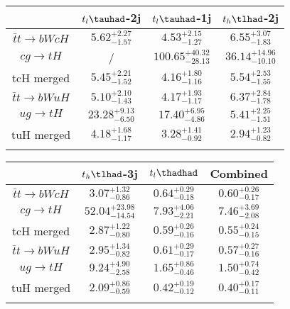 \centering
\begin{tabular}{|cccc} \toprule\toprule
 & $t_l\tauhad$-2j & $t_l\tauhad$-1j & $t_h\tlhad$-2j\\\midrule
$\bar{t}t\to bWcH$ & $5.62^{+2.27}_{-1.57}$ & $4.53^{+2.15}_{-1.27}$ & $6.55^{+3.07}_{-1.83}$\\
$cg\to tH$ &  / & $100.65^{+40.32}_{-28.13}$ & $36.14^{+14.96}_{-10.10}$\\
tcH merged & $5.45^{+2.21}_{-1.52}$ & $4.16^{+1.80}_{-1.16}$ & $5.54^{+2.53}_{-1.55}$\\
$\bar{t}t\to bWuH$ & $5.10^{+2.10}_{-1.43}$ & $4.17^{+1.93}_{-1.17}$ & $6.37^{+2.84}_{-1.78}$\\
$ug\to tH$ & $23.28^{+9.13}_{-6.50}$ & $17.40^{+6.95}_{-4.86}$ & $5.41^{+2.25}_{-1.51}$\\
tuH merged & $4.18^{+1.68}_{-1.17}$ & $3.28^{+1.41}_{-0.92}$ & $2.94^{+1.23}_{-0.82}$\\
\bottomrule\bottomrule\\
\end{tabular}
\begin{tabular}{|cccc} \toprule\toprule
 & $t_h\tlhad$-3j & $t_l\thadhad$ & Combined\\\midrule
$\bar{t}t\to bWcH$ & $3.07^{+1.32}_{-0.86}$ & $0.64^{+0.29}_{-0.18}$ & $0.60^{+0.26}_{-0.17}$\\
$cg\to tH$ & $52.04^{+23.98}_{-14.54}$ & $7.93^{+4.06}_{-2.21}$ & $7.46^{+3.69}_{-2.08}$\\
tcH merged & $2.87^{+1.22}_{-0.80}$ & $0.59^{+0.26}_{-0.16}$ & $0.55^{+0.24}_{-0.15}$\\
$\bar{t}t\to bWuH$ & $2.95^{+1.34}_{-0.82}$ & $0.61^{+0.29}_{-0.17}$ & $0.57^{+0.27}_{-0.16}$\\
$ug\to tH$ & $9.24^{+4.90}_{-2.58}$ & $1.65^{+0.86}_{-0.46}$ & $1.50^{+0.74}_{-0.42}$\\
tuH merged & $2.09^{+0.86}_{-0.59}$ & $0.42^{+0.19}_{-0.12}$ & $0.40^{+0.17}_{-0.11}$\\
\bottomrule\bottomrule\\
\end{tabular}
